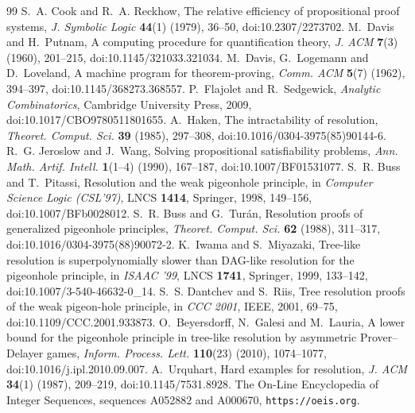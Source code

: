 \documentclass[11pt]{article}
\theoremstyle{definition}
\theoremstyle{remark}
\begin{document}
\begin{thebibliography}{99}
 S.~A. Cook and R.~A. Reckhow, The relative efficiency of propositional proof systems, \emph{J. Symbolic Logic} \textbf{44}(1) (1979), 36--50, doi:10.2307/2273702.
 M.~Davis and H.~Putnam, A computing procedure for quantification theory, \emph{J. ACM} \textbf{7}(3) (1960), 201--215, doi:10.1145/321033.321034.
 M.~Davis, G.~Logemann and D.~Loveland, A machine program for theorem-proving, \emph{Comm. ACM} \textbf{5}(7) (1962), 394--397, doi:10.1145/368273.368557.
 P.~Flajolet and R.~Sedgewick, \emph{Analytic Combinatorics}, Cambridge University Press, 2009, doi:10.1017/CBO9780511801655.
 A.~Haken, The intractability of resolution, \emph{Theoret. Comput. Sci.} \textbf{39} (1985), 297--308, doi:10.1016/0304-3975(85)90144-6.
 R.~G. Jeroslow and J.~Wang, Solving propositional satisfiability problems, \emph{Ann. Math. Artif. Intell.} \textbf{1}(1--4) (1990), 167--187, doi:10.1007/BF01531077.
 S.~R. Buss and T.~Pitassi, Resolution and the weak pigeonhole principle, in \emph{Computer Science Logic (CSL'97)}, LNCS \textbf{1414}, Springer, 1998, 149--156, doi:10.1007/BFb0028012.
 S.~R. Buss and G.~Tur\'an, Resolution proofs of generalized pigeonhole principles, \emph{Theoret. Comput. Sci.} \textbf{62} (1988), 311--317, doi:10.1016/0304-3975(88)90072-2.
 K.~Iwama and S.~Miyazaki, Tree-like resolution is superpolynomially slower than DAG-like resolution for the pigeonhole principle, in \emph{ISAAC '99}, LNCS \textbf{1741}, Springer, 1999, 133--142, doi:10.1007/3-540-46632-0\_14.
 S.~S. Dantchev and S.~Riis, Tree resolution proofs of the weak pigeon-hole principle, in \emph{CCC 2001}, IEEE, 2001, 69--75, doi:10.1109/CCC.2001.933873.
 O.~Beyersdorff, N.~Galesi and M.~Lauria, A lower bound for the pigeonhole principle in tree-like resolution by asymmetric Prover--Delayer games, \emph{Inform. Process. Lett.} \textbf{110}(23) (2010), 1074--1077, doi:10.1016/j.ipl.2010.09.007.
 A.~Urquhart, Hard examples for resolution, \emph{J. ACM} \textbf{34}(1) (1987), 209--219, doi:10.1145/7531.8928.
 The On-Line Encyclopedia of Integer Sequences, sequences A052882 and A000670, \texttt{https://oeis.org}.
\end{thebibliography}
\end{document}
